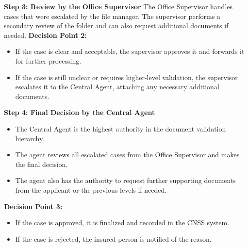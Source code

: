 \textbf{ Step 3: Review by the Office Supervisor}
The Office Supervisor handles cases that were escalated by the file manager.
The supervisor performs a secondary review of the folder and can also request additional documents if needed.
\textbf{Decision Point 2:}
\begin{itemize}
    \item If the case is clear and acceptable, the supervisor approves it and forwards it for further processing.
    \item If the case is still unclear or requires higher-level validation, the supervisor escalates it to the Central Agent, attaching any necessary additional documents.
\end{itemize}
 \textbf{ Step 4: Final Decision by the Central Agent}
\begin{itemize}
    \item The Central Agent is the highest authority in the document validation hierarchy.
    \item The agent reviews all escalated cases from the Office Supervisor and makes the final decision.
    \item The agent also has the authority to request further supporting documents from the applicant or the previous levels if needed.
\end{itemize}
\textbf{Decision Point 3:}
\begin{itemize}
    \item If the case is approved, it is finalized and recorded in the CNSS system.
    \item If the case is rejected, the insured person is notified of the reason.
\end{itemize}

